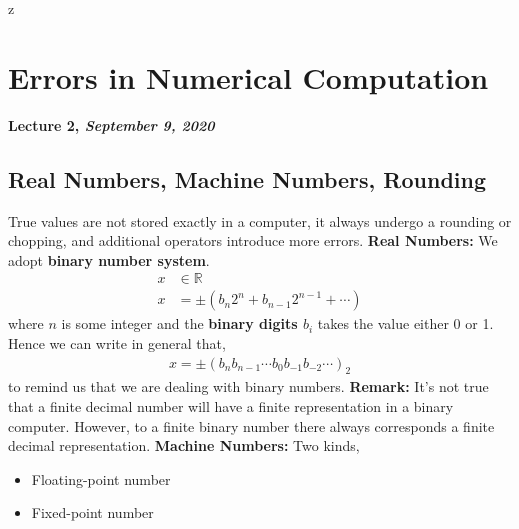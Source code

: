 z\documentclass[a4paper,12pt,twoside]{book}
\begin{document}
\chapter{Errors in Numerical Computation}
\textbf{Lecture 2, \textit{September 9, 2020}}
\newline\newline
\section{Real Numbers, Machine Numbers, Rounding}
True values are not stored exactly in a computer, it always undergo a rounding or chopping, and additional operators introduce more errors.
\newline\newline
\textbf{Real Numbers: } We adopt \textbf{binary number system}.
\begin{equation*}
	\begin{split}
		x &\in \mathbb{R}\\
		x &= \pm \left( b_n 2^{n} + b_{n-1}2^{n-1} +\cdots \right) 
	\end{split}
\end{equation*}
where $n$ is some integer and the  \textbf{binary digits $b_i$} takes the value either 0 or 1. Hence we can write in general that,
\begin{equation*}
	\begin{split}
		x = \pm\left( b_n b_{n-1} \cdots b_0 b_{-1} b_{-2} \cdots \right) _2
	\end{split}
\end{equation*}
to remind us that we are dealing with binary numbers.
\newline\newline
\textbf{Remark: } It's not true that a finite decimal number will have a finite representation in a binary computer. However, to a finite binary number there always corresponds a finite decimal representation.
\newline\newline
\textbf{Machine Numbers:} Two kinds,
\begin{itemize}
	\item {Floating-point number}
	\item{Fixed-point number}
\end{itemize}
\end{document}
